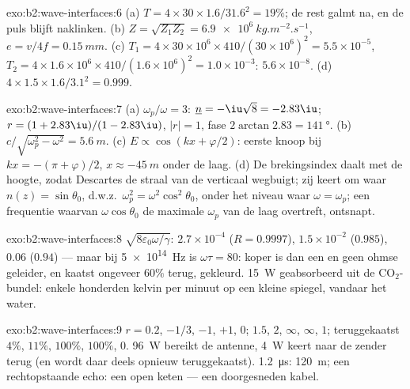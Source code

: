 \begin{solution}{exo:b2:wave-interfaces:6}
(a) $T = 4 \times 30 \times 1.6/31.6^2 = 19\%$; de rest galmt na, en de puls
blijft naklinken. (b) $Z = \sqrt{Z_1Z_2} = \qty{6.9e6}{kg.m^{-2}.s^{-1}}$,
$e = v/4f = \qty{0.15}{mm}$. (c)
$T_1 = 4 \times 30 \times 10^6 \times 410/(30 \times 10^6)^2 = 5.5 \times 10^{-5}$,
$T_2 = 4 \times 1.6 \times
10^6 \times 410/(1.6 \times 10^6)^2 = 1.0 \times 10^{-3}$:
$5.6 \times 10^{-8}$. (d) $4 \times 1.5 \times 1.6/
3.1^2 = 0.999$.
\end{solution}

\begin{solution}{exo:b2:wave-interfaces:7}
(a) $\omega_p/\omega = 3$: $\underline n = -\iu\sqrt8 = -2.83\iu$;
$r = (1 + 2.83\iu)/(1 - 2.83
\iu)$, $|r| = 1$, fase
$2\arctan2.83 = \qty{141}{\degree}$. (b)
$c/\sqrt{\omega_p^2 - \omega^2}
= \qty{5.6}{m}$. (c)
$E \propto \cos(kx + \varphi/2)$: eerste knoop bij
$kx = -(\pi + \varphi)/2$, $x \approx \qty{-45}{m}$ onder de laag. (d) De
brekingsindex daalt met de hoogte, zodat Descartes de straal van de
verticaal wegbuigt; zij keert om waar $n(z) = \sin\theta_0$, d.w.z.\
$\omega_p^2 = \omega^2\cos^2\theta_0$, onder het niveau waar
$\omega = \omega_p$; een frequentie waarvan $\omega\cos\theta_0$ de maximale
$\omega_p$ van de laag overtreft, ontsnapt.
\end{solution}

\begin{solution}{exo:b2:wave-interfaces:8}
$\sqrt{8\varepsilon_0\omega/\gamma}$: $2.7 \times 10^{-4}$ ($R = 0.9997$),
$1.5 \times 10^{-2}$ ($0.985$), $0.06$ ($0.94$) --- maar bij \qty{5e14}{Hz}
is $\omega\tau = 80$: koper is dan een  en geen ohmse geleider, en
kaatst ongeveer $60\%$ terug, gekleurd. \qty{15}{W} geabsorbeerd uit de
CO$_2$-bundel: enkele honderden kelvin per minuut op een kleine spiegel,
vandaar het water.
\end{solution}

\begin{solution}{exo:b2:wave-interfaces:9}
$r = 0.2$, $-1/3$, $-1$, $+1$, $0$;  $1.5$, $2$,
$\infty$, $\infty$, $1$; teruggekaatst $4\%$, $11\%$, $100\%$, $100\%$, $0$.
\qty{96}{W} bereikt de antenne, \qty{4}{W} keert naar de zender terug (en
wordt daar deels opnieuw teruggekaatst). \qty{1.2}{\micro s}: \qty{120}{m};
een rechtopstaande echo: een open keten --- een doorgesneden kabel.
\end{solution}


